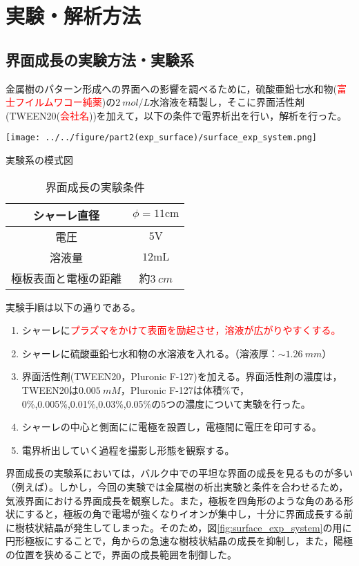 \documentclass[autodetect-engine,dvi=dvipdfmx,a4paper,ja=standard,oneside,openany,11pt,draft]{bxjsbook}
\begin{document}
\section{実験・解析方法}
\subsection{界面成長の実験方法・実験系}
金属樹のパターン形成への界面への影響を調べるために，硫酸亜鉛七水和物(\textcolor{red}{富士フイルムワコー純薬})の$\SI{2}{mol/L}$水溶液を精製し，そこに界面活性剤(TWEEN20(\textcolor{red}{会社名}))を加えて，以下の条件で電界析出を行い，解析を行った。
\begin{table}[H]
  \begin{minipage}{0.5\hsize}
    \centering
    \texttt{[image: ../../figure/part2(exp\_surface)/surface\_exp\_system.png]}
    \caption{実験系の模式図}
    \label{fig:surface_exp_system}
  \end{minipage}
  \begin{minipage}{0.5\hsize}
    \centering
    \caption{界面成長の実験条件}
    \begin{tabular}{c||c}
      \hline
      シャーレ直径     & $\phi = 11 \si{\cm}$ \\ \hline
      電圧         & $5 \si{\V}$          \\ \hline
      溶液量        & $12 \si{\mL}$        \\
      極板表面と電極の距離 & 約$\SI{3}{cm}$        \\
      \hline
    \end{tabular}
    \label{tab:surface_exp_condition}
  \end{minipage}
  \label{fig:surface_exp_system_condition}
\end{table}
実験手順は以下の通りである。
\begin{enumerate}
  \item シャーレに\textcolor{red}{プラズマをかけて表面を励起させ，溶液が広がりやすくする。}
  \item シャーレに硫酸亜鉛七水和物の水溶液を入れる。（溶液厚：$\sim\SI{1.26}{mm}$）
  \item 界面活性剤(TWEEN20，Pluronic F-127)を加える。界面活性剤の濃度は，TWEEN20は$\SI{0.005}{mM}$，Pluronic F-127は体積\%で，0\%,0.005\%,0.01\%,0.03\%,0.05\%の5つの濃度について実験を行った。
  \item シャーレの中心と側面にに電極を設置し，電極間に電圧を印可する。
  \item 電界析出していく過程を撮影し形態を観察する。
\end{enumerate}
界面成長の実験系においては，バルク中での平坦な界面の成長を見るものが多い（例えば\cite{schilardi1998evolution}）。しかし，今回の実験では金属樹の析出実験と条件を合わせるため，気液界面における界面成長を観察した。また，極板を四角形のような角のある形状にすると，極板の角で電場が強くなりイオンが集中し，十分に界面成長する前に樹枝状結晶が発生してしまった。そのため，図\ref{fig:surface_exp_system}の用に円形極板にすることで，角からの急速な樹枝状結晶の成長を抑制し，また，陽極の位置を狭めることで，界面の成長範囲を制御した。
\end{document}
